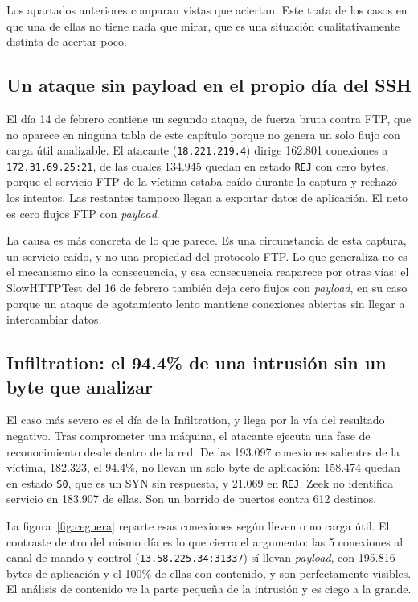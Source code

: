 Los apartados anteriores comparan vistas que aciertan. Este trata de los casos
en que una de ellas no tiene nada que mirar, que es una situación
cualitativamente distinta de acertar poco.

\subsection*{Un ataque sin payload en el propio día del SSH}

El día 14 de febrero contiene un segundo ataque, de fuerza bruta contra FTP, que
no aparece en ninguna tabla de este capítulo porque no genera un solo flujo con
carga útil analizable. El atacante (\texttt{18.221.219.4}) dirige 162.801
conexiones a \texttt{172.31.69.25:21}, de las cuales 134.945 quedan en estado
\texttt{REJ} con cero bytes, porque el servicio FTP de la víctima estaba caído
durante la captura y rechazó los intentos. Las restantes tampoco llegan a
exportar datos de aplicación. El neto es cero flujos FTP con \emph{payload}.

La causa es más concreta de lo que parece. Es una circunstancia de esta captura, un
servicio caído, y no una propiedad del protocolo FTP. Lo que generaliza no es el
mecanismo sino la consecuencia, y esa consecuencia reaparece por otras vías: el
SlowHTTPTest del 16 de febrero también deja cero flujos con \emph{payload}, en
su caso porque un ataque de agotamiento lento mantiene conexiones abiertas sin
llegar a intercambiar datos.

\subsection*{Infiltration: el 94.4\% de una intrusión sin un byte que analizar}

El caso más severo es el día de la Infiltration, y llega por la vía del
resultado negativo. Tras comprometer una máquina, el atacante ejecuta una fase
de reconocimiento desde dentro de la red. De las 193.097 conexiones salientes de
la víctima, 182.323, el 94.4\%, no llevan un solo byte de aplicación: 158.474
quedan en estado \texttt{S0}, que es un SYN sin respuesta, y 21.069 en
\texttt{REJ}. Zeek no identifica servicio en 183.907 de ellas. Son un barrido de
puertos contra 612 destinos.

La figura~\ref{fig:ceguera} reparte esas conexiones según lleven o no carga
útil. El contraste dentro del mismo día es lo que cierra el argumento: las 5
conexiones al canal de mando y control (\texttt{13.58.225.34:31337}) sí llevan
\emph{payload}, con 195.816 bytes de aplicación y el 100\% de ellas con
contenido, y son perfectamente visibles. El análisis de contenido ve la parte
pequeña de la intrusión y es ciego a la grande.

